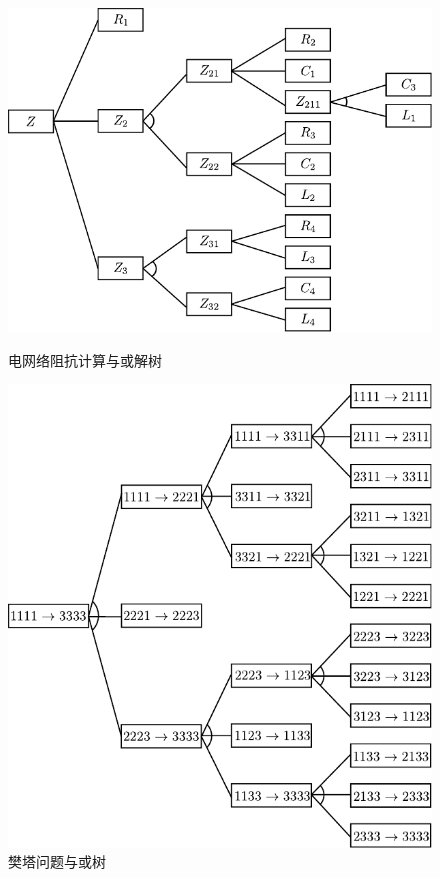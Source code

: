 	\begin{figure}[H]
		\centering
		\includegraphics[scale=.8]{figures/ans-2.4.pdf}
		\caption{电网络阻抗计算与或解树} \label{Fig:and-or-tree-for-elec}
		\vspace{1cm}
		\includegraphics[scale=.8]{figures/ans-2.5.pdf}
		\caption{樊塔问题与或树} \label{Fig:and-or-tree-for-hannoi}
	\end{figure}

